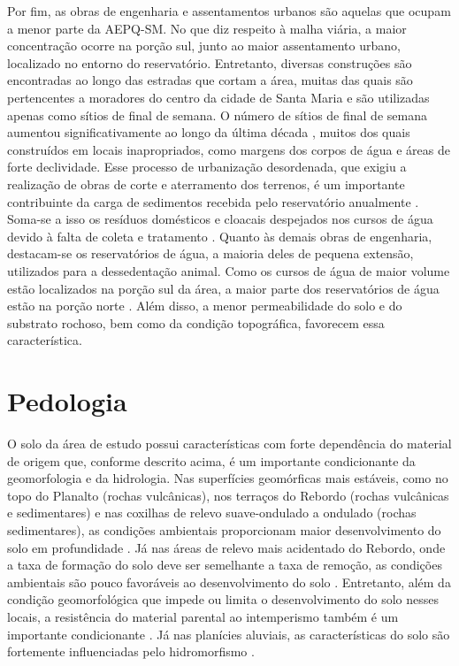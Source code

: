 Por fim, as obras de engenharia e assentamentos urbanos são aquelas que ocupam a menor parte da AEPQ-SM. No que diz respeito à malha viária, a maior concentração ocorre na porção sul, junto ao maior assentamento urbano, localizado no entorno do reservatório. Entretanto, diversas construções são encontradas ao longo das estradas que cortam a área, muitas das quais são pertencentes a moradores do centro da cidade de Santa Maria e são utilizadas apenas como sítios de final de semana. O número de sítios de final de semana aumentou significativamente ao longo da última década \cite{Goldani2006}, muitos dos quais construídos em locais inapropriados, como margens dos corpos de água e áreas de forte declividade. Esse processo de urbanização desordenada, que exigiu a realização de obras de corte e aterramento dos terrenos, é um importante contribuinte da carga de sedimentos recebida pelo reservatório anualmente \cite{PaivaEtAl2001, DillEtAl2004}. Soma-se a isso os resíduos domésticos e cloacais despejados nos cursos de água devido à falta de coleta e tratamento \cite{Goldani2006}. Quanto às demais obras de engenharia, destacam-se os reservatórios de água, a maioria deles de pequena extensão, utilizados para a dessedentação animal. Como os cursos de água de maior volume estão localizados na porção sul da área, a maior parte dos reservatórios de água estão na porção norte \cite{SamuelRosaEtAl2011a}. Além disso, a menor permeabilidade do solo e do substrato rochoso, bem como da condição topográfica, favorecem essa característica.

\section{Pedologia}

O solo da área de estudo possui características com forte dependência do material de origem \cite{NascimentoEtAl2010} que, conforme descrito acima, é um importante condicionante da geomorfologia e da hidrologia. Nas superfícies geomórficas mais estáveis, como no topo do Planalto (rochas vulcânicas), nos terraços do Rebordo (rochas vulcânicas e sedimentares) e nas coxilhas de relevo suave-ondulado a ondulado (rochas sedimentares), as condições ambientais proporcionam maior desenvolvimento do solo em profundidade \cite{Moser1990}. Já nas áreas de relevo mais acidentado do Rebordo, onde a taxa de formação do solo deve ser semelhante a taxa de remoção, as condições ambientais são pouco favoráveis ao desenvolvimento do solo \cite{Moser1990, DalmolinEtAl2006a, Sturmer2008, SamuelRosaEtAl2011a}. Entretanto, além da condição geomorfológica que impede ou limita o desenvolvimento do solo nesses locais, a resistência do material parental ao intemperismo também é um importante condicionante \cite{Pedron2007}. Já nas planícies aluviais, as características do solo são fortemente influenciadas pelo hidromorfismo \cite{Moser1990, Miguel2010}.

